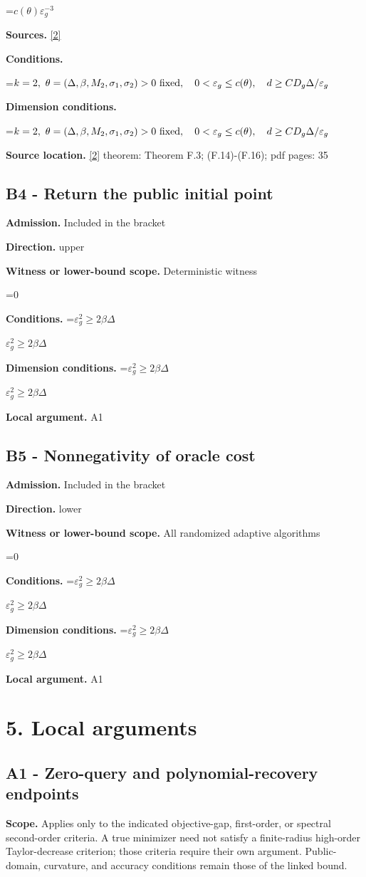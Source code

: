 \documentclass[10pt,a4paper]{article}
\newcommand{\AtlasMath}[1]{\par\begingroup\centering\setbox0=\hbox{$\displaystyle #1$}\ifdim\wd0>1.4\linewidth\typeout{ATLAS WIDE FORMULA: \the\wd0}\fi\ifdim\wd0>\linewidth\resizebox{\linewidth}{!}{\box0}\else\box0\fi\par\endgroup}
\newcommand{\AtlasInlineMath}[1]{\begingroup\setbox0=\hbox{$#1$}\ifdim\wd0>.4\linewidth\endgroup\AtlasMath{#1}\else\endgroup$#1$\fi}
\begin{document}
\AtlasMath{c(\theta)\varepsilon_g^{-3}}
\textbf{Sources.} \href{https://arxiv.org/pdf/2609.28238v2}{[2]}

\textbf{Conditions.} 
\AtlasMath{k=2,\ \theta=(\Delta,\beta,M_2,\sigma_1,\sigma_2)>0\ {\rm fixed},\quad0<\varepsilon_g\le c(\theta),\quad d\ge C D_g\Delta/\varepsilon_g}


\textbf{Dimension conditions.} 
\AtlasMath{k=2,\ \theta=(\Delta,\beta,M_2,\sigma_1,\sigma_2)>0\ {\rm fixed},\quad0<\varepsilon_g\le c(\theta),\quad d\ge C D_g\Delta/\varepsilon_g}


\textbf{Source location.} \href{https://arxiv.org/pdf/2609.28238v2}{[2]} theorem: Theorem F.3; (F.14)-(F.16); pdf pages: 35

\subsection{B4 - Return the public initial point}
\textbf{Admission.} Included in the bracket

\textbf{Direction.} upper

\textbf{Witness or lower-bound scope.} Deterministic witness

\AtlasMath{0}
\textbf{Conditions.} \AtlasInlineMath{\varepsilon_g^2\ge2\beta\Delta}

\textbf{Dimension conditions.} \AtlasInlineMath{\varepsilon_g^2\ge2\beta\Delta}

\textbf{Local argument.} A1

\subsection{B5 - Nonnegativity of oracle cost}
\textbf{Admission.} Included in the bracket

\textbf{Direction.} lower

\textbf{Witness or lower-bound scope.} All randomized adaptive algorithms

\AtlasMath{0}
\textbf{Conditions.} \AtlasInlineMath{\varepsilon_g^2\ge2\beta\Delta}

\textbf{Dimension conditions.} \AtlasInlineMath{\varepsilon_g^2\ge2\beta\Delta}

\textbf{Local argument.} A1

\section{5. Local arguments}
\subsection{A1 - Zero-query and polynomial-recovery endpoints}
\textbf{Scope.} Applies only to the indicated objective-gap, first-order, or spectral second-order criteria. A true minimizer need not satisfy a finite-radius high-order Taylor-decrease criterion; those criteria require their own argument. Public-domain, curvature, and accuracy conditions remain those of the linked bound.
\end{document}
